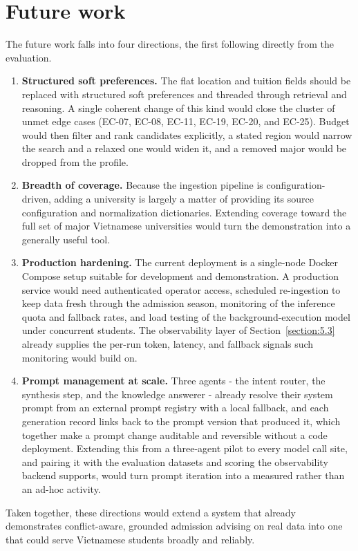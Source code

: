 \documentclass[../main.tex]{subfiles}
\begin{document}
\section{Future work}
\label{section:6.2}

The future work falls into four directions, the first following directly from the evaluation.

\begin{enumerate}
    \item \textbf{Structured soft preferences.} The flat location and tuition fields should be replaced with structured soft preferences and threaded through retrieval and reasoning. A single coherent change of this kind would close the cluster of unmet edge cases (EC-07, EC-08, EC-11, EC-19, EC-20, and EC-25). Budget would then filter and rank candidates explicitly, a stated region would narrow the search and a relaxed one would widen it, and a removed major would be dropped from the profile.
    \item \textbf{Breadth of coverage.} Because the ingestion pipeline is configuration-driven, adding a university is largely a matter of providing its source configuration and normalization dictionaries. Extending coverage toward the full set of major Vietnamese universities would turn the demonstration into a generally useful tool.
    \item \textbf{Production hardening.} The current deployment is a single-node Docker Compose setup suitable for development and demonstration. A production service would need authenticated operator access, scheduled re-ingestion to keep data fresh through the admission season, monitoring of the inference quota and fallback rates, and load testing of the background-execution model under concurrent students. The observability layer of Section~\ref{section:5.3} already supplies the per-run token, latency, and fallback signals such monitoring would build on.
    \item \textbf{Prompt management at scale.} Three agents - the intent router, the synthesis step, and the knowledge answerer - already resolve their system prompt from an external prompt registry with a local fallback, and each generation record links back to the prompt version that produced it, which together make a prompt change auditable and reversible without a code deployment. Extending this from a three-agent pilot to every model call site, and pairing it with the evaluation datasets and scoring the observability backend supports, would turn prompt iteration into a measured rather than an ad-hoc activity.
\end{enumerate}

Taken together, these directions would extend a system that already demonstrates conflict-aware, grounded admission advising on real data into one that could serve Vietnamese students broadly and reliably.
\end{document}

